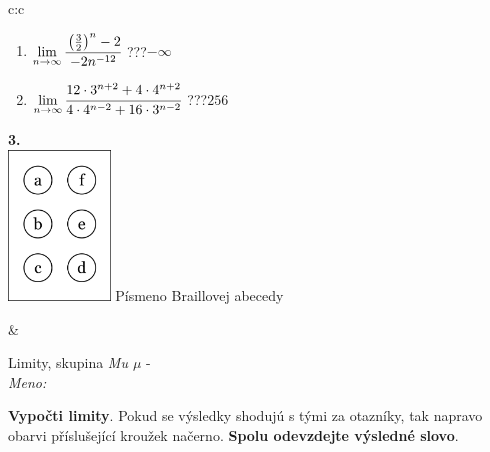 \documentclass[10pt]{report}
\begin{document}
\begin{tabular}{c:c}
\begin{minipage}[c][104.5mm][t]{0.5\linewidth}
\begin{center}
\begin{minipage}{0.79\linewidth}
\begin{center}
\begin{varwidth}{\linewidth}
\begin{enumerate}
\item $\lim\limits_{n\to\infty}\cfrac{\left(\frac{3}{2}\right)^n -2}{-2n^{-12}}$\quad \dotfill\; ???\;\dotfill \quad $-\infty$
\item $\lim\limits_{n\to\infty}\cfrac{12\cdot 3^{n+2}+4\cdot 4^{n+2}}{4\cdot 4^{n-2}+16\cdot 3^{n-2}}$\quad \dotfill\; ???\;\dotfill \quad $256$
\end{enumerate}
\end{varwidth}
\end{center}
\end{minipage}
\begin{minipage}{0.20\linewidth}
\begin{center}
{\Huge\bfseries 3.} \\[2mm]
\includegraphics[height=40mm]{../images/braille.png}
{\small Písmeno Braillovej abecedy}
\end{center}
\end{minipage}
\end{center}
\end{minipage}
&
\begin{minipage}[c][104.5mm][t]{0.5\linewidth}
\begin{center}
\vspace{7mm}
{\huge Limity, skupina \textit{Mu $\mu$} -}\\[5mm]
\textit{Meno:}\phantom{xxxxxxxxxxxxxxxxxxxxxxxxxxxxxxxxxxxxxxxxxxxxxxxxxxxxxxxxxxxxxxxxx}\\[5mm]
\begin{minipage}{0.95\linewidth}
\begin{center}
\textbf{Vypočti limity}. Pokud se výsledky shodujú s tými za otazníky, tak napravo\\obarvi příslušející kroužek načerno. \textbf{Spolu odevzdejte výsledné slovo}.
\end{center}
\end{minipage}
\\[1mm]
\begin{minipage}{0.79\linewidth}
\begin{center}
\begin{varwidth}{\linewidth}

\end{varwidth}
\end{center}
\end{minipage}
\end{center}
\end{minipage}
\end{tabular}
\end{document}
